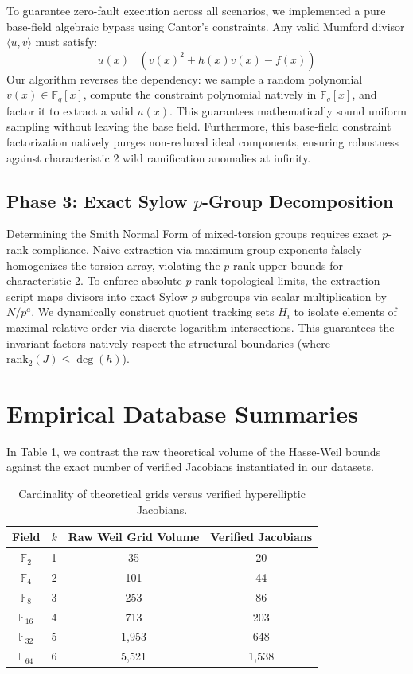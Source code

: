 \documentclass[letterpaper, 11pt]{article}
\begin{document}
To guarantee zero-fault execution across all scenarios, we implemented a pure base-field algebraic bypass using Cantor's constraints. Any valid Mumford divisor $\langle u, v \rangle$ must satisfy:
\begin{equation}
    u(x) \mid \left( v(x)^2 + h(x)v(x) - f(x) \right)
\end{equation}
Our algorithm reverses the dependency: we sample a random polynomial $v(x) \in \mathbb{F}_q[x]$, compute the constraint polynomial natively in $\mathbb{F}_q[x]$, and factor it to extract a valid $u(x)$. This guarantees mathematically sound uniform sampling without leaving the base field. Furthermore, this base-field constraint factorization natively purges non-reduced ideal components, ensuring robustness against characteristic 2 wild ramification anomalies at infinity.

\subsection{Phase 3: Exact Sylow \texorpdfstring{$p$}{p}-Group Decomposition}
Determining the Smith Normal Form of mixed-torsion groups requires exact $p$-rank compliance. Naive extraction via maximum group exponents falsely homogenizes the torsion array, violating the $p$-rank upper bounds for characteristic 2. To enforce absolute $p$-rank topological limits, the extraction script maps divisors into exact Sylow $p$-subgroups via scalar multiplication by $N/p^a$. We dynamically construct quotient tracking sets $H_i$ to isolate elements of maximal relative order via discrete logarithm intersections. This guarantees the invariant factors natively respect the structural boundaries (where $\text{rank}_2(J) \le \deg(h)$). 

\section{Empirical Database Summaries}
In Table 1, we contrast the raw theoretical volume of the Hasse-Weil bounds against the exact number of verified Jacobians instantiated in our datasets.

\begin{table}[h!]
\centering
\begin{tabular}{cccc}
\toprule
Field & $k$ & Raw Weil Grid Volume & Verified Jacobians \\
\midrule
$\mathbb{F}_2$ & 1 & 35 & 20 \\
$\mathbb{F}_4$ & 2 & 101 & 44 \\
$\mathbb{F}_8$ & 3 & 253 & 86 \\
$\mathbb{F}_{16}$ & 4 & 713 & 203 \\
$\mathbb{F}_{32}$ & 5 & 1,953 & 648 \\
$\mathbb{F}_{64}$ & 6 & 5,521 & 1,538 \\
\bottomrule
\end{tabular}
\caption{Cardinality of theoretical grids versus verified hyperelliptic Jacobians.}
\end{table}
\end{document}
